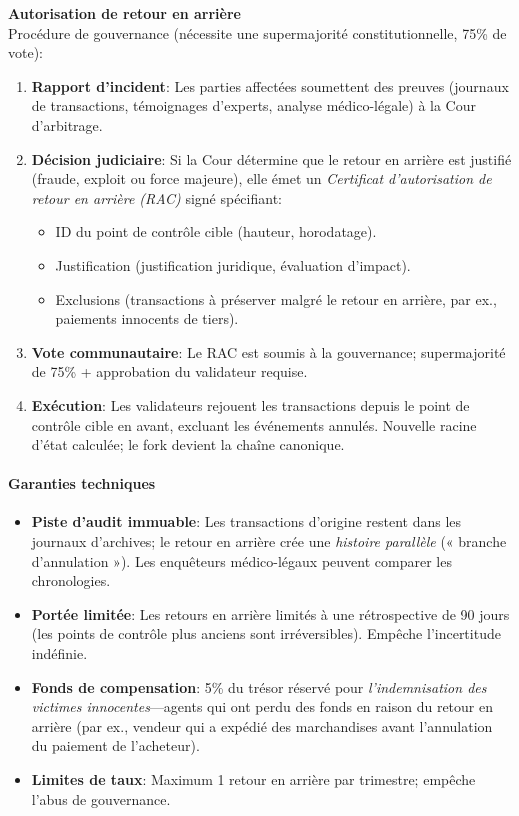 \documentclass[11pt]{article}
\begin{document}
\textbf{Autorisation de retour en arrière}\\
Procédure de gouvernance (nécessite une supermajorité constitutionnelle, 75\% de vote):
\begin{enumerate}[noitemsep]
  \item \textbf{Rapport d'incident}: Les parties affectées soumettent des preuves (journaux de transactions, témoignages d'experts, analyse médico-légale) à la Cour d'arbitrage.
  \item \textbf{Décision judiciaire}: Si la Cour détermine que le retour en arrière est justifié (fraude, exploit ou force majeure), elle émet un \emph{Certificat d'autorisation de retour en arrière (RAC)} signé spécifiant:
    \begin{itemize}[noitemsep]
      \item ID du point de contrôle cible (hauteur, horodatage).
      \item Justification (justification juridique, évaluation d'impact).
      \item Exclusions (transactions à préserver malgré le retour en arrière, par ex., paiements innocents de tiers).
    \end{itemize}
  \item \textbf{Vote communautaire}: Le RAC est soumis à la gouvernance; supermajorité de 75\% + approbation du validateur requise.
  \item \textbf{Exécution}: Les validateurs rejouent les transactions depuis le point de contrôle cible en avant, excluant les événements annulés. Nouvelle racine d'état calculée; le fork devient la chaîne canonique.
\end{enumerate}

\paragraph{Garanties techniques}
\begin{itemize}[noitemsep]
  \item \textbf{Piste d'audit immuable}: Les transactions d'origine restent dans les journaux d'archives; le retour en arrière crée une \emph{histoire parallèle} (« branche d'annulation »). Les enquêteurs médico-légaux peuvent comparer les chronologies.
  \item \textbf{Portée limitée}: Les retours en arrière limités à une rétrospective de 90 jours (les points de contrôle plus anciens sont irréversibles). Empêche l'incertitude indéfinie.
  \item \textbf{Fonds de compensation}: 5\% du trésor réservé pour \emph{l'indemnisation des victimes innocentes}—agents qui ont perdu des fonds en raison du retour en arrière (par ex., vendeur qui a expédié des marchandises avant l'annulation du paiement de l'acheteur).
  \item \textbf{Limites de taux}: Maximum 1 retour en arrière par trimestre; empêche l'abus de gouvernance.
\end{itemize}
\end{document}
